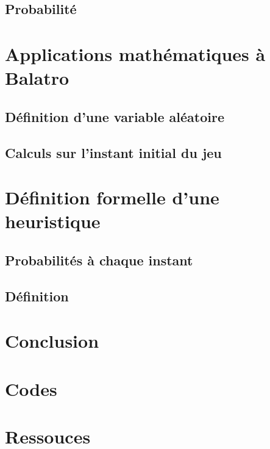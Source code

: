 \documentclass[10pt]{report}
\begin{document}
    \newpage

    \section{Probabilité}   

    \chapter{Applications mathématiques à Balatro}
    \section{Définition d'une variable aléatoire}

    \newpage

    \section{Calculs sur l'instant initial du jeu}

    \chapter{Définition formelle d'une heuristique}
    \section{Probabilités à chaque instant}

    \newpage

    \section{Définition}
    
    \chapter{Conclusion}

    \appendix
    \chapter{Codes}

    \newpage

    \chapter{Ressouces}
\end{document}
